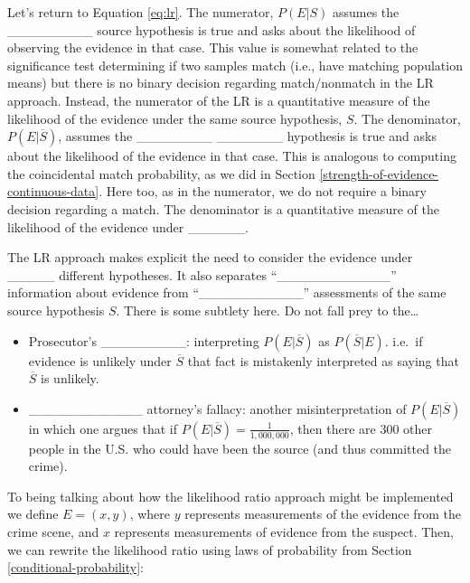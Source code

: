 \documentclass[]{book}
\providecommand{\tightlist}{%
  \setlength{\itemsep}{0pt}\setlength{\parskip}{0pt}}
\theoremstyle{definition}
\theoremstyle{definition}
\theoremstyle{remark}
\begin{document}
Let's return to Equation \ref{eq:lr}. The numerator, \(P(E|S)\) assumes
the \_\_\_\_\_\_\_\_\_ source hypothesis is true and asks about the
likelihood of observing the evidence in that case. This value is
somewhat related to the significance test determining if two samples
match (i.e., have matching population means) but there is no binary
decision regarding match/nonmatch in the LR approach. Instead, the
numerator of the LR is a quantitative measure of the likelihood of the
evidence under the same source hypothesis, \(S\). The denominator,
\(P(E|\overline{S})\), assumes the \_\_\_\_\_\_\_\_ \_\_\_\_\_\_\_
hypothesis is true and asks about the likelihood of the evidence in that
case. This is analogous to computing the coincidental match probability,
as we did in Section \ref{strength-of-evidence-continuous-data}. Here
too, as in the numerator, we do not require a binary decision regarding
a match. The denominator is a quantitative measure of the likelihood of
the evidence under \_\_\_\_\_\_.

The LR approach makes explicit the need to consider the evidence under
\_\_\_\_\_ different hypotheses. It also separates
``\_\_\_\_\_\_\_\_\_\_\_\_'' information about evidence from
``\_\_\_\_\_\_\_\_\_\_\_'' assessments of the same source hypothesis
\(S\). There is some subtlety here. Do not fall prey to the\ldots{}

\begin{itemize}
\tightlist
\item
  Prosecutor's \_\_\_\_\_\_\_\_\_: interpreting \(P(E|\overline{S})\) as
  \(P(\overline{S}|E)\). i.e.~if evidence is unlikely under
  \(\overline{S}\) that fact is mistakenly interpreted as saying that
  \(\overline{S}\) is unlikely. \vspace{.1in}
\item
  \_\_\_\_\_\_\_\_\_\_\_\_ attorney's fallacy: another misinterpretation
  of \(P(E|\overline{S})\) in which one argues that if
  \(P(E|\overline{S}) = \frac{1}{1,000,000}\), then there are 300 other
  people in the U.S. who could have been the source (and thus committed
  the crime).
\end{itemize}

To being talking about how the likelihood ratio approach might be
implemented we define \(E=(x,y)\), where \(y\) represents measurements
of the evidence from the crime scene, and \(x\) represents measurements
of evidence from the suspect. Then, we can rewrite the likelihood ratio
using laws of probability from Section \ref{conditional-probability}:
\end{document}
